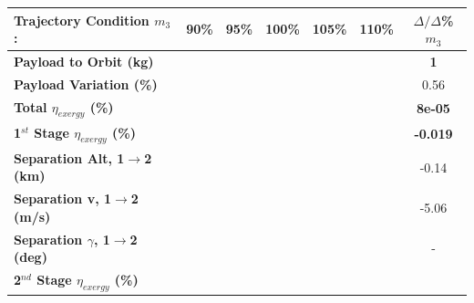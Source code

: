 \begin{table}[ht]
	\centering
	\begin{tabular}{l c c c c c c} 
		\hline \textbf{Trajectory Condition}   \qquad  $m_{3}$:
		&90\%
		&95\%
		&100\%
		&105\%
		&110\%
		& $\Delta/\Delta$\%$m_{3}$
		\\
		\hline \textbf{Payload to Orbit (kg)}
		& \textbf{\PayloadToOrbitmThreeNinety}
		& \textbf{\PayloadToOrbitmThreeNinetyFive}
		& \textbf{\PayloadToOrbitmThreeStandard}
		& \textbf{\PayloadToOrbitmThreeOneHundredFive}
		& \textbf{\PayloadToOrbitmThreeOneHundredTen}
		&\textbf{1}
		\\
		\textbf{Payload Variation (\%)}
		& \PayloadVarmThreeNinety
		& \PayloadVarmThreeNinetyFive
		& \PayloadVarmThreeStandard
		& \PayloadVarmThreeOneHundredFive
		& \PayloadVarmThreeOneHundredTen
		&0.56
		\\
		\textbf{Total $\eta_{exergy}$ (\%)}
		& \textbf{\totalExergyEffmThreeNinety}
		& \textbf{\totalExergyEffmThreeNinetyFive}
		& \textbf{\totalExergyEffmThreeStandard}
		& \textbf{\totalExergyEffmThreeOneHundredFive}
		& \textbf{\totalExergyEffmThreeOneHundredTen}
		& \textbf{8e-05}
		\\
		\hline 
		\textbf{1$^{st}$ Stage $\eta_{exergy}$ (\%)}
		& \textbf{\firstExergyEffmThreeNinety}
		& \textbf{\firstExergyEffmThreeNinetyFive}
		& \textbf{\firstExergyEffmThreeStandard}
		& \textbf{\firstExergyEffmThreeOneHundredFive}
		& \textbf{\firstExergyEffmThreeOneHundredTen}
		& \textbf{-0.019}
		\\
		\textbf{Separation Alt, 1$\rightarrow$2 (km)}
		& \firstsecondSeparationAltmThreeNinety
		& \firstsecondSeparationAltmThreeNinetyFive
		& \firstsecondSeparationAltmThreeStandard
		& \firstsecondSeparationAltmThreeOneHundredFive
		& \firstsecondSeparationAltmThreeOneHundredTen
		&-0.14
		\\
		\textbf{Separation v, 1$\rightarrow$2 (m/s)}
		& \firstsecondSeparationvmThreeNinety
		& \firstsecondSeparationvmThreeNinetyFive
		& \firstsecondSeparationvmThreeStandard
		& \firstsecondSeparationvmThreeOneHundredFive
		& \firstsecondSeparationvmThreeOneHundredTen
		&-5.06
		\\
		\textbf{Separation $\gamma$, 1$\rightarrow$2 (deg)}
		& \firstsecondSeparationgammamThreeNinety
		& \firstsecondSeparationgammamThreeNinetyFive
		& \firstsecondSeparationgammamThreeStandard
		& \firstsecondSeparationgammamThreeOneHundredFive
		& \firstsecondSeparationgammamThreeOneHundredTen
		& -
		\\
		\hline 
		\textbf{2$^{nd}$ Stage $\eta_{exergy}$ (\%)}

\end{tabular}
\end{table}
